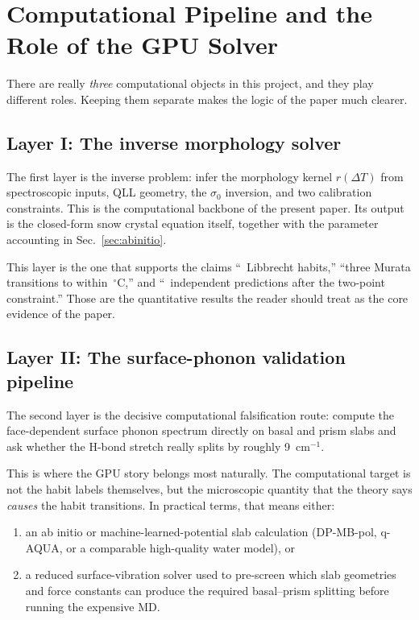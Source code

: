 \documentclass[12pt,letterpaper]{article}
\begin{document}
\section{Computational Pipeline and the Role of the GPU Solver}
\label{sec:computational}

There are really \emph{three} computational objects in this project, and they play different roles.
Keeping them separate makes the logic of the paper much clearer.

\subsection{Layer I: The inverse morphology solver}

The first layer is the inverse problem: infer the morphology kernel
$r(\Delta T)$ from spectroscopic inputs, QLL geometry, the
$\sigma_0$ inversion, and two calibration constraints.
This is the computational backbone of the present paper.
Its output is the closed-form snow crystal equation itself, together
with the parameter accounting in Sec.~\ref{sec:abinitio}.

This layer is the one that supports the claims
``\SnowHabitMatch\ Libbrecht habits,'' ``three Murata transitions to within
\SnowMurataMaxError$\,{}^\circ$C,'' and ``\SnowPredictionMatch\ independent predictions after the
two-point constraint.''
Those are the quantitative results the reader should treat as the
core evidence of the paper.

\subsection{Layer II: The surface-phonon validation pipeline}

The second layer is the decisive computational falsification route:
compute the face-dependent surface phonon spectrum directly on basal
and prism slabs and ask whether the H-bond stretch really splits by
roughly 9~cm$^{-1}$.

This is where the GPU story belongs most naturally.
The computational target is not the habit labels themselves, but the
microscopic quantity that the theory says \emph{causes} the habit
transitions.
In practical terms, that means either:
\begin{enumerate}[nosep]
\item an ab initio or machine-learned-potential slab calculation
      (DP-MB-pol, q-AQUA, or a comparable high-quality water model),
      or
\item a reduced surface-vibration solver used to pre-screen which
      slab geometries and force constants can produce the required
      basal--prism splitting before running the expensive MD.
\end{enumerate}
\end{document}
